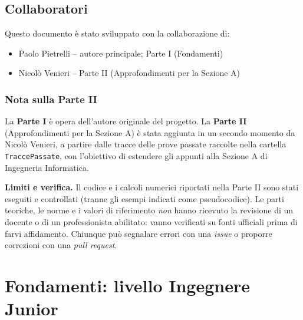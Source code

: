 \documentclass[a4paper,12pt,openright,twoside]{book}
\begin{document}
\cleardoublepage
\chapter*{Collaboratori}
Questo documento è stato sviluppato con la collaborazione di:
\begin{itemize}
  \item Paolo Pietrelli – autore principale; Parte I (Fondamenti)
  \item Nicolò Venieri – Parte II (Approfondimenti per la Sezione A)
\end{itemize}

\section*{Nota sulla Parte II}
La \textbf{Parte I} è opera dell'autore originale del progetto.
La \textbf{Parte II} (Approfondimenti per la Sezione A) è stata aggiunta
in un secondo momento da Nicolò Venieri, a partire dalle tracce delle
prove passate raccolte nella cartella \texttt{TraccePassate}, con
l'obiettivo di estendere gli appunti alla Sezione A di Ingegneria
Informatica.

\medskip
\noindent
\textbf{Limiti e verifica.} Il codice e i calcoli numerici riportati
nella Parte II sono stati eseguiti e controllati (tranne gli esempi
indicati come pseudocodice). Le parti teoriche, le
norme e i valori di riferimento \emph{non} hanno ricevuto la revisione
di un docente o di un professionista abilitato: vanno verificati su fonti
ufficiali prima di farvi affidamento. Chiunque può segnalare errori con una \emph{issue} o proporre
correzioni con una \emph{pull request}.

\tableofcontents
\listoffigures
\lstlistoflistings

\mainmatter

\part{Fondamenti: livello Ingegnere Junior}



\end{document}

